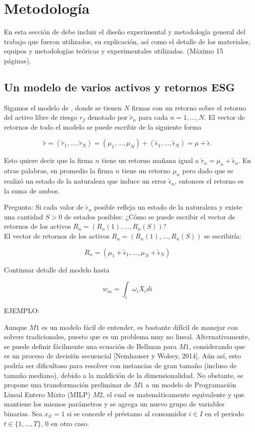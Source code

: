 
\chapter{Metodología}
\label{ch:metodo} %

{\color{blue} En esta sección de debe incluir el diseño experimental y metodología general del trabajo que fueron utilizados, su explicación, así como el detalle de los materiales, equipos y metodologías teóricas y experimentales utilizadas. (Máximo 15 páginas). }

\section{Un modelo de varios activos y retornos ESG}

Sigamos el modelo de , donde se tienen $N$ firmas con un retorno sobre el retorno del activo libre de riesgo $r_f$ denotado por $\tilde r_n$ para cada $n=1,...,N$. El vector de retornos de todo el modelo se puede escribir de la siguiente forma

$$\tilde r=(\tilde r_1,...,\tilde r_N)=(\mu_1,...,\mu_N)+(\tilde\epsilon_1,...,\tilde\epsilon_N)=\mu+\tilde\epsilon.$$

Esto quiere decir que la firma $n$ tiene un retorno mañana igual a $\tilde r_n=\mu_n+\tilde\epsilon_n$. En otras palabras, en promedio la firma $n$ tiene un retorno $\mu_n$ pero dado que se realizó un estado de la naturaleza que induce un error $\tilde\epsilon_n$, entonces el retorno es la suma de ambos.

Pregunta: Si cada valor de $\tilde\epsilon_n$ posible refleja un estado de la naturaleza y existe una cantidad $S>0$ de estados posibles: ¿Cómo se puede escribir el vector de retornos de los activos $R_n=(R_n(1),...,R_n(S))$?\\

El vector de retornos de los activos $R_n=(R_n(1),...,R_n(S))$ se escribiría:

$$R_n=(\mu_1 + \tilde\epsilon_1,...,\mu_N + \tilde\epsilon_N)$$

Continuar detalle del modelo hasta 

$$w_m=\int_i\omega_iX_idi$$

\newpage
EJEMPLO:

Aunque $M1$ es un modelo fácil de entender, es bastante difícil de manejar con solvers tradicionales, puesto que es un problema muy no lineal. Alternativamente, se puede definir fácilmente una ecuación de Bellman para $M1$, considerando que es un proceso de decisión secuencial [Nemhauser y Wolsey, 2014]. Aún así, esto podría ser dificultoso para resolver con instancias de gran tamaño (incluso de tamaño mediano), debido a la maldición de la dimensionalidad. No obstante, se propone una transformación preliminar de $M1$ a un modelo de Programación Lineal Entero Mixto (MILP) $M2$, el cual es matemáticamente equivalente y que mantiene los mismos parámetros y se agrega un nuevo grupo de variables binarias. Sea $x_{it} = 1$ si se concede el préstamo al consumidor $i \in I$ en el periodo $t \in \{1,...,T\}$, 0 en otro caso.  \\


